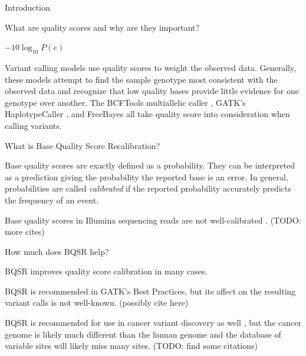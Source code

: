 \documentclass{article}
\begin{document}
\linenumbers
\begin{outline}
	\item Introduction
	\begin{outline}
		\item What are quality scores and why are they important? \parencite{ewing_base-calling_1998} \parencite{ewing_base-calling_1998-1}
		\begin{outline}
			\item $-10\log_{10}P(e)$ \parencite{ewing_base-calling_1998} \parencite{ewing_base-calling_1998-1}
			\item Variant calling models use quality scores to weight the observed data. Generally, these models attempt to find the sample genotype most consistent with the observed data and recognize that low quality bases provide little evidence for one genotype over another. The BCFTools multiallelic caller \parencite{li_sequence_2009}, GATK's HaplotypeCaller \parencite{poplin_scaling_2018}, and FreeBayes \parencite{garrison_haplotype-based_2012} all take quality score into consideration when calling variants.
		\end{outline}
		\item What is Base Quality Score Recalibration?
		\begin{outline}
			\item Base quality scores are exactly defined as a probability. They can be interpreted as a prediction giving the probability the reported base is an error. In general, probabilities are called \textit{calibrated} if the reported probability accurately predicts the frequency of an event.
			\item Base quality scores in Illumina sequencing reads are not well-calibrated \parencite{callahan_dada2:_2016}. (TODO: more cites)
		\end{outline}
		\item How much does BQSR help?
		\begin{outline}
			\item BQSR improves quality score calibration in many cases.
			\item BQSR is recommended in GATK's Best Practices, but its affect on the resulting variant calls is not well-known. (possibly cite \cite{ni_improvement_2016} here)
			\item BQSR is recommended for use in cancer variant discovery as well \parencite{cibulskis_sensitive_2013}, but the cancer genome is likely much different than the human genome and the database of variable sites will likely miss many sites. (TODO: find some citations)

\end{outline}
\end{outline}
\end{outline}
\end{document}

